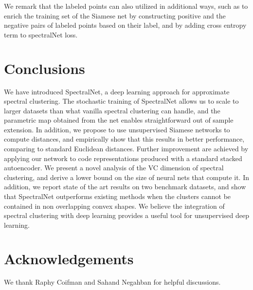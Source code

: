 \documentclass{article} %
\begin{document}
We remark that the labeled points can also utilized in additional ways, such as to enrich the training set of the Siamese net by constructing  positive and the negative pairs of labeled points based on their label, and by adding cross entropy term to spectralNet loss.






\section {Conclusions}\label{sec:conclusions}

We have introduced SpectralNet, a deep learning approach for approximate spectral clustering.
The stochastic training of SpectralNet allows us to scale to larger datasets than what vanilla spectral clustering can handle, and the parametric map obtained from the net enables straightforward out of sample extension.
In addition, we propose to use unsupervised Siamese networks to compute distances, and empirically show that this results in better performance, comparing to standard Euclidean distances.
Further improvement are achieved by applying our network to code representations produced with a standard stacked autoencoder. We present a novel analysis of the VC dimension of spectral clustering, and derive a lower bound on the size of neural nets that compute it.
In addition, we report state of the art results on two benchmark datasets, and show that SpectralNet outperforms existing methods when the clusters cannot be contained in non overlapping convex shapes.
We believe the integration of spectral clustering with deep learning provides a useful tool for unsupervised deep learning.

\section* {Acknowledgements}
We thank Raphy Coifman and Sahand Negahban for helpful discussions.




\newpage
\appendix
\end{document}
